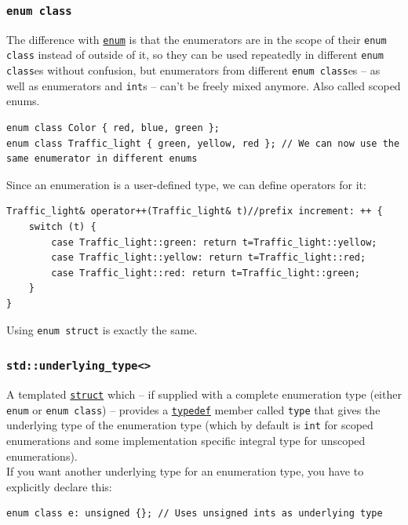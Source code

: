 \documentclass[table, xcdraw]{article}%
\begin{document}
\subsubsection{\texttt{enum class}}
The difference with \hyperref[enum]{\texttt{enum}} is that the enumerators are in the scope of their \texttt{enum class} instead of outside of it, so they can be used repeatedly in different \texttt{enum class}es without confusion, but enumerators from different \texttt{enum class}es -- as well as enumerators and \texttt{int}s -- can't be freely mixed anymore. Also called scoped enums.

\begin{verbatim}
enum class Color { red, blue, green };
enum class Traffic_light { green, yellow, red }; // We can now use the same enumerator in different enums
\end{verbatim}

Since an enumeration is a user-defined type, we can define operators for it:

\begin{verbatim}
Traffic_light& operator++(Traffic_light& t)//prefix increment: ++ {
    switch (t) {
        case Traffic_light::green: return t=Traffic_light::yellow;
        case Traffic_light::yellow: return t=Traffic_light::red;
        case Traffic_light::red: return t=Traffic_light::green;
    }
}
\end{verbatim}

Using \texttt{enum struct} is exactly the same.

\subsubsection{\texttt{std::underlying_type<>}}

A templated \hyperref[struct]{\texttt{struct}} which -- if supplied with a complete enumeration type (either \texttt{enum} or \texttt{enum class}) -- provides a \hyperref[typedef]{\texttt{typedef}} member called \texttt{type} that gives the underlying type of the enumeration type (which by default is \texttt{int} for scoped enumerations and some implementation specific integral type for unscoped enumerations).\\
If you want another underlying type for an enumeration type, you have to explicitly declare this:

\begin{verbatim}
enum class e: unsigned {}; // Uses unsigned ints as underlying type
\end{verbatim}
\end{document}
